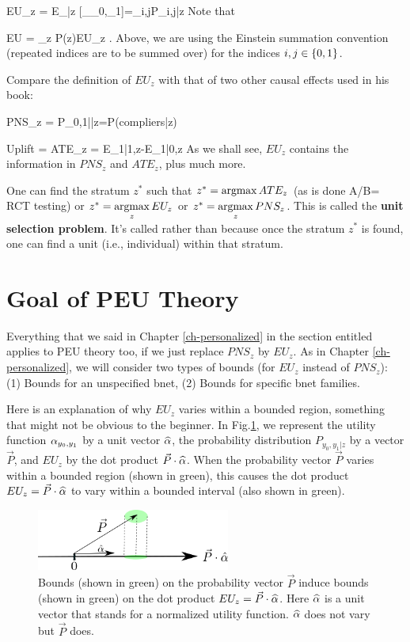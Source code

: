 \beq
EU_z = E_{|z}
[\alp_{\rvy_0,\rvy_1}]=\alp_{i,j}P_{i,j|z}
\eeq
Note that

\beq
EU = \sum_z  P(z)EU_z
\;.
\eeq
Above, we are using the Einstein
 summation convention
(repeated indices are to be summed over)
for the indices $i,j\in \{0,1\}$.

Compare the definition of $EU_z$
with that of two other causal effects used 
in his book:

\beq
PNS_z = P_{0,1||z}=P(compliers|z)
\eeq

\beq
Uplift = ATE_z = E_{1|1,z}-E_{1|0,z}
\eeq
As we shall see,
$EU_z$ contains the information
in $PNS_z$ and $ATE_z$,  plus much more.

 
One can
find the stratum $z^*$
such that
$z^*=\mathop{\mathrm{argmax}}\limits ATE_z$ (as is done A/B= RCT testing) or
 $z^*=\mathop{\mathrm{argmax}}\limits_z EU_z$ or
$z^*=\mathop{\mathrm{argmax}}\limits_z PNS_z$.
This is called the
{\bf unit selection problem}.
It's called 
rather than 
because once the  
stratum $z^*$ is found,
one can find a unit 
(i.e., individual) within
that stratum.







\section{Goal of PEU Theory}
Everything that we said 
in Chapter \ref{ch-personalized}
in the section entitled 
applies to PEU theory too,
if we just replace $PNS_z$
by $EU_z$.
As in Chapter \ref{ch-personalized}, 
we will consider two types of bounds (for
$EU_z$ instead of $PNS_z$):
(1) Bounds for an unspecified bnet,
(2) Bounds for specific bnet families.


Here is
an explanation 
of why $EU_z$
varies within a bounded region,
something that might 
not be obvious to the beginner.
In  Fig.\ref{fig-peu-utility},
we represent the utility
function $\alpha_{y_0, y_1}$
by a unit vector ${\widehat{\alpha}}$,
the probability distribution 
$P_{y_0, y_1|z}$ by a vector $\vec{P}$,
and $EU_z$ by the dot product 
$\vec{P}\cdot {\widehat{\alpha}}$.
When the probability
vector $\vec{P}$ varies within a bounded region
(shown in green),
this causes
the dot 
product $EU_z=\vec{P}\cdot {\widehat{\alpha}}$
to vary within a bounded interval (also
shown in green).



\begin{figure}[h!]
\centering
\includegraphics[width=2.5in]
{personalized-exp-util/utility.png}
\caption{Bounds (shown in green)
on the probability
vector $\vec{P}$
induce bounds (shown in green) on the dot 
product $EU_z=\vec{P}\cdot {\widehat{\alpha}}$.
Here ${\widehat{\alpha}}$ is a unit vector
that stands for a normalized 
utility function. ${\widehat{\alpha}}$
does not vary but $\vec{P}$ does.
} 
\label{fig-peu-utility}
\end{figure}

